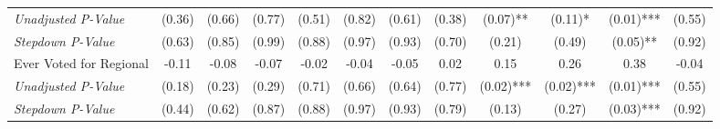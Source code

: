 \begin{tabular}{l c c c c c c c c c c c}
\quad \textit{Unadjusted P-Value} & (0.36) & (0.66) & (0.77) & (0.51) & (0.82) & (0.61) & (0.38) & (0.07)** & (0.11)* & (0.01)*** & (0.55) \\
\quad \textit{Stepdown P-Value} & (0.63) & (0.85) & (0.99) & (0.88) & (0.97) & (0.93) & (0.70) & (0.21) & (0.49) & (0.05)** & (0.92) \\
Ever Voted for Regional & -0.11 & -0.08 & -0.07 & -0.02 & -0.04 & -0.05 & 0.02 & 0.15 & 0.26 & 0.38 & -0.04 \\
\quad \textit{Unadjusted P-Value} & (0.18) & (0.23) & (0.29) & (0.71) & (0.66) & (0.64) & (0.77) & (0.02)*** & (0.02)*** & (0.01)*** & (0.55) \\
\quad \textit{Stepdown P-Value} & (0.44) & (0.62) & (0.87) & (0.88) & (0.97) & (0.93) & (0.79) & (0.13) & (0.27) & (0.03)*** & (0.92) \\
\bottomrule
\end{tabular}
